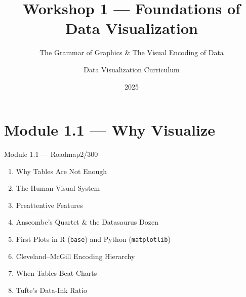 \documentclass[10pt]{beamer}
\title{Workshop 1 --- Foundations of Data Visualization}
\subtitle{The Grammar of Graphics \& The Visual Encoding of Data}
\author{Data Visualization Curriculum}
\date{2025}
\institute{Comparative R \& Python Approach}
\newcommand{\smark}[1]{\hfill{\scriptsize\color{codegray}#1}}
\begin{document}
\maketitle

\section{Module 1.1 --- Why Visualize}

\begin{frame}{Module 1.1 --- Roadmap}\smark{2/300}
\begin{enumerate}
    \item Why Tables Are Not Enough
    \item The Human Visual System
    \item Preattentive Features
    \item Anscombe's Quartet \& the Datasaurus Dozen
    \item First Plots in R (\texttt{base}) and Python (\texttt{matplotlib})
    \item Cleveland--McGill Encoding Hierarchy
    \item When Tables Beat Charts
    \item Tufte's Data-Ink Ratio
\end{enumerate}
\end{frame}
\end{document}
